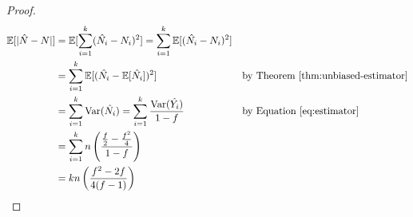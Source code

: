 \documentclass{article}
\begin{document}
\begin{enumerate}
\begin{proof}
	\begin{align*}
		\mathbb{E}[|\hat{N}-N|] &= \mathbb{E}[\sum\limits_{i=1}^k(\hat{N_i}-N_i)^2] = \sum\limits_{i=1}^k\mathbb{E}[(\hat{N_i}-N_i)^2] &&\\
			&= \sum\limits_{i=1}^k\mathbb{E}[(\hat{N_i}-\mathbb{E}[\hat{N_i}])^2] && \text{by Theorem~\ref{thm:unbiased-estimator}}\\
			&= \sum\limits_{i=1}^k\text{Var}(\hat{N_i}) = \sum\limits_{i=1}^k\frac{\text{Var}(\hat{Y_i})}{1-f}&&\text{by Equation~\ref{eq:estimator}}\\
			&= \sum\limits_{i=1}^kn\left(\frac{\frac{f}{2}-\frac{f^2}{4}}{1-f}\right) &&\\
			&= kn\left(\frac{f^2-2f}{4(f-1)}\right)
	\end{align*}
	
\end{proof}
\end{enumerate}



\end{document}
